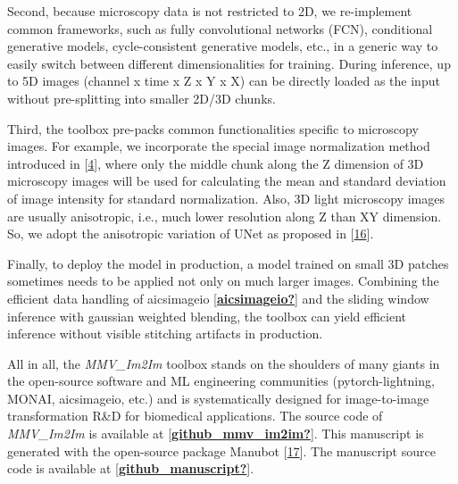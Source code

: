 Second, because microscopy data is not restricted to 2D, we re-implement common frameworks, such as fully convolutional networks (FCN), conditional generative models, cycle-consistent generative models, etc., in a generic way to easily switch between different dimensionalities for training. During inference, up to 5D images (channel x time x Z x Y x X) can be directly loaded as the input without pre-splitting into smaller 2D/3D chunks.

Third, the toolbox pre-packs common functionalities specific to microscopy images. For example, we incorporate the special image normalization method introduced in {[}\protect\hyperlink{ref-Yq8wZ6hc}{4}{]}, where only the middle chunk along the Z dimension of 3D microscopy images will be used for calculating the mean and standard deviation of image intensity for standard normalization. Also, 3D light microscopy images are usually anisotropic, i.e., much lower resolution along Z than XY dimension. So, we adopt the anisotropic variation of UNet as proposed in {[}\protect\hyperlink{ref-jM3v1UjQ}{16}{]}.

Finally, to deploy the model in production, a model trained on small 3D patches sometimes needs to be applied not only on much larger images. Combining the efficient data handling of aicsimageio {[}\protect\hyperlink{ref-aicsimageio}{\textbf{aicsimageio?}}{]} and the sliding window inference with gaussian weighted blending, the toolbox can yield efficient inference without visible stitching artifacts in production.

All in all, the \emph{MMV\_Im2Im} toolbox stands on the shoulders of many giants in the open-source software and ML engineering communities (pytorch-lightning, MONAI, aicsimageio, etc.) and is systematically designed for image-to-image transformation R\&D for biomedical applications. The source code of \emph{MMV\_Im2Im} is available at {[}\protect\hyperlink{ref-github_mmv_im2im}{\textbf{github\_mmv\_im2im?}}{]}. This manuscript is generated with the open-source package Manubot {[}\protect\hyperlink{ref-YuJbg3zO}{17}{]}. The manuscript source code is available at {[}\protect\hyperlink{ref-github_manuscript}{\textbf{github\_manuscript?}}{]}.

